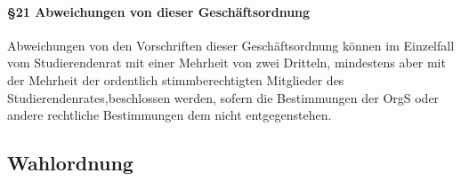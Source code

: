         \paragraph{§21 Abweichungen von dieser Geschäftsordnung}
            Abweichungen von den Vorschriften dieser Geschäftsordnung können im Einzelfall vom Studierendenrat mit einer Mehrheit von zwei Dritteln, mindestens aber mit der Mehrheit der ordentlich stimmberechtigten Mitglieder des Studierendenrates,beschlossen werden, sofern die Bestimmungen der OrgS oder andere rechtliche Bestimmungen dem nicht entgegenstehen.
\subsection{Wahlordnung\label{appendix:5}}